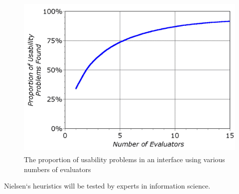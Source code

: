 \begin{figure}[H]
    \centering
    \includegraphics[width=120mm,height=8cm,keepaspectratio]{figures/heur_eval_finding_curve.png}
    \caption{The proportion of usability problems in an interface using various numbers of evaluators\cite{Nngroup}}
    \label{NN}
\end{figure}
Nielsen`s heuristics will be tested by experts in information science.


